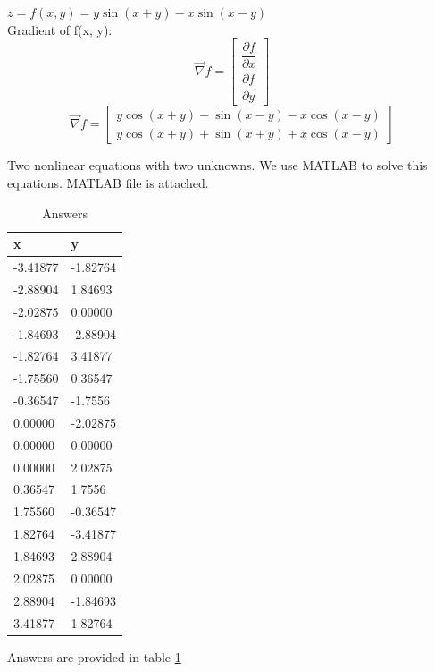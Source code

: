 $z = f(x, y) = y\sin(x+y)-x\sin(x-y)$ \\
Gradient of f(x, y):
$$\vec{\nabla} f = \begin{bmatrix}
	\dfrac{\partial f}{\partial x} \\[6pt]
	\dfrac{\partial f}{\partial y}
\end{bmatrix} $$
$$\vec{\nabla} f = \begin{bmatrix}
	y \cos(x + y) - \sin(x - y) - x  \cos(x - y) \\
	y  \cos(x + y) + \sin(x + y) + x  \cos(x - y)
\end{bmatrix} $$

Two nonlinear equations with two unknowns. We use MATLAB to solve this equations. MATLAB file is attached.
\begin{table}[h]
				\caption {Answers} \label{ans} 
	\begin{center}
		\begin{tabular}{| l | l |}
			\hline
			x & y\\ \hline
			-3.41877 & -1.82764 \\ \hline
			-2.88904 & 1.84693 \\ \hline
			-2.02875 & 0.00000 \\ \hline
			-1.84693 & -2.88904 \\ \hline
			-1.82764 & 3.41877 \\ \hline
			-1.75560 & 0.36547 \\  \hline
			-0.36547 & -1.7556 \\ \hline
			0.00000 & -2.02875 \\ \hline
			0.00000 & 0.00000 \\ \hline
			0.00000 & 2.02875 \\ \hline
			0.36547 & 1.7556 \\ \hline
			1.75560 & -0.36547 \\ \hline
			1.82764 & -3.41877 \\ \hline
			1.84693 & 2.88904 \\ \hline
			2.02875 & 0.00000 \\ \hline
			2.88904 & -1.84693 \\ \hline
			3.41877 & 1.82764 \\ \hline
		\end{tabular}
	\end{center}
\end{table}
Answers are provided in table \ref{ans}


